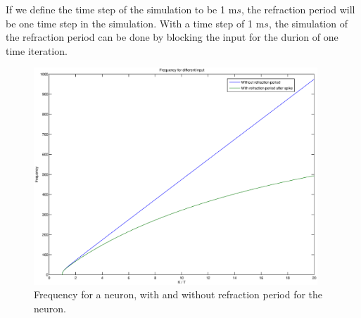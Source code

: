 If we define the time step of the simulation to be 1 m$s$, the refraction period will be one time step in the simulation.
With a time step of 1 m$s$, the simulation of the refraction period can be done by blocking the input for the durion of one time iteration.


\begin{figure}[bhtp]
	\begin{center}
		\includegraphics[width=0.95\textwidth]{frekvensPlotRefractionPeriod}
	\end{center}
	\caption{Frequency for a neuron, with and without refraction period for the neuron.}
	\label{figFrekvensMedOgUtenRefractionPeriod}
\end{figure}



